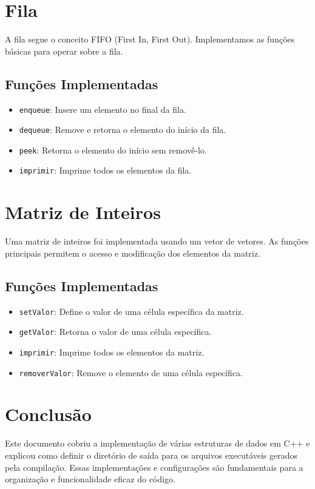\documentclass{article}
\begin{document}
\section{Fila}
A fila segue o conceito FIFO (First In, First Out). Implementamos as funções básicas para operar sobre a fila.

\subsection{Funções Implementadas}
\begin{itemize}
    \item \texttt{enqueue}: Insere um elemento no final da fila.
    \item \texttt{dequeue}: Remove e retorna o elemento do início da fila.
    \item \texttt{peek}: Retorna o elemento do início sem removê-lo.
    \item \texttt{imprimir}: Imprime todos os elementos da fila.
\end{itemize}

\section{Matriz de Inteiros}
Uma matriz de inteiros foi implementada usando um vetor de vetores. As funções principais permitem o acesso e modificação dos elementos da matriz.

\subsection{Funções Implementadas}
\begin{itemize}
    \item \texttt{setValor}: Define o valor de uma célula específica da matriz.
    \item \texttt{getValor}: Retorna o valor de uma célula específica.
    \item \texttt{imprimir}: Imprime todos os elementos da matriz.
    \item \texttt{removerValor}: Remove o elemento de uma célula específica.
\end{itemize}

\section{Conclusão}
Este documento cobriu a implementação de várias estruturas de dados em C++ e explicou como definir o diretório de saída para os arquivos executáveis gerados pela compilação. Essas implementações e configurações são fundamentais para a organização e funcionalidade eficaz do código.
\end{document}

